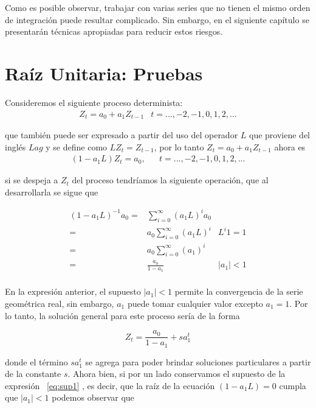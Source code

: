 Como es posible observar, trabajar con varias series que no tienen el mismo orden de integración puede resultar complicado. Sin embargo, en el siguiente capítulo se presentarán técnicas apropiadas para reducir estos riesgos. 



\section{Raíz Unitaria: Pruebas} \label{pruebas_orden_integracion}

Consideremos el siguiente proceso determinista:
\begin{eqnarray}
Z_t = a_0+a_1 Z_{t-1} &  t=...,-2,-1,0,1,2,...
\end{eqnarray}

que también puede ser expresado a partir del uso del operador $L $ que proviene del inglés $Lag$ y se define como $LZ_t=Z_{t-1}$, por lo tanto $ Z_t = a_0+a_1 Z_{t-1}$ ahora es
\begin{eqnarray}
(1-a_1L)Z_t = a_0,  & &  t=...,-2,-1,0,1,2,...
\end{eqnarray}

si se despeja a $Z_t$ del proceso tendríamos la siguiente operación, que al desarrollarla se sigue que 

\begin{eqnarray} \label{eq:sup1} 
 (1-a_1L)^{-1} a_0 =&  \sum_{i=0}^{\infty} (a_1L)^{i}a_0  &  \nonumber  \\ 
        = & a_0\sum_{i=0}^{\infty} (a_1L)^{i} & L^i 1=1  \nonumber \\
         = & a_0\sum_{i=0}^{\infty} (a_1)^{i} &  \\
         = & \frac{a_0}{1-a_1} & \left | a_1 \right |<1  \nonumber \\
 & &  \nonumber
\end{eqnarray}


En la expresión anterior, el supuesto $\left | a_1 \right |<1$ permite la convergencia de la serie geométrica real, sin embargo, $a_1$  puede tomar cualquier valor excepto $a_1=1$.   Por lo tanto, la solución general para este proceso sería de la forma 

\begin{equation}
Z_t=\frac{a_0}{1-a_1} + sa_1^t
\end{equation} 

donde  el t\'ermino $sa_1^t$ se agrega para poder brindar soluciones particulares a partir de la constante $s$. Ahora bien, si por un lado conservamos el supuesto de la expresión ~\ref{eq:sup1} , es decir, que la raíz de la ecuación $(1-a_1L)=0$ cumpla que $\left | a_1 \right |<1$  podemos observar que

